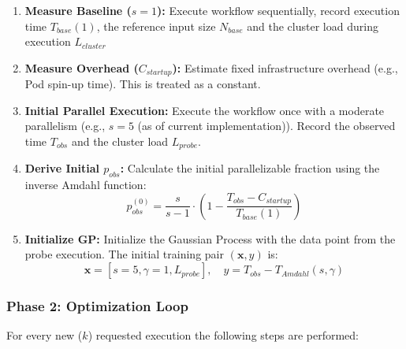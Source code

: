 \documentclass[a4paper, 12pt]{article}
\begin{document}
	\begin{enumerate}
		\item \textbf{Measure Baseline ($s=1$):} Execute workflow sequentially, record execution time $T_{base}(1)$, the reference input size $N_{base}$ and the cluster load during execution $L_{cluster}$
		
		\item \textbf{Measure Overhead ($C_{startup}$):} 
		Estimate fixed infrastructure overhead (e.g., Pod spin-up time). This is treated as a constant.
		
		\item \textbf{Initial Parallel Execution:} 
		Execute the workflow once with a moderate parallelism (e.g., $s=5$ (as of current implementation)). Record the observed time $T_{obs}$ and the cluster load $L_{probe}$.
		
		\item \textbf{Derive Initial $p_{obs}$:} 
		Calculate the initial parallelizable fraction using the inverse Amdahl function:
		\[
		p_{obs}^{(0)} = \frac{s}{s-1} \cdot \left(1 - \frac{T_{obs} - C_{startup}}{T_{base}(1)}\right)
		\]
		\item \textbf{Initialize GP:} 
		Initialize the Gaussian Process with the data point from the probe execution. The initial training pair $(\mathbf{x}, y)$ is:
		\[
		\mathbf{x} = [s=5, \gamma=1, L_{probe}], \quad y = T_{obs} - T_{Amdahl}(s, \gamma)
		\]
	\end{enumerate}
	
	\subsubsection*{Phase 2: Optimization Loop}
	For every new ($k$) requested execution the following steps are performed:
	
\end{document}
